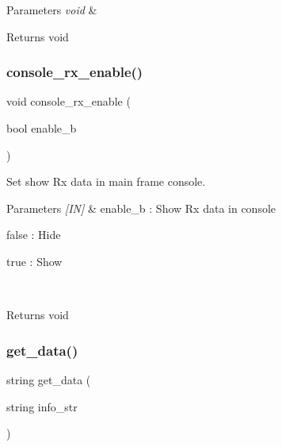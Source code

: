 \begin{DoxyCode}{0}
\end{DoxyCode}



\begin{DoxyParams}{Parameters}
{\em void} & \\
\hline
\end{DoxyParams}
\begin{DoxyReturn}{Returns}
void 
\end{DoxyReturn}
\mbox{\label{classmain__frame_a42466769794c3edd479bc62db0f796f1}} 
\subsubsection{console\_rx\_enable()}
{\footnotesize\ttfamily void console\+\_\+rx\+\_\+enable (\begin{DoxyParamCaption}\item[{bool}]{enable\+\_\+b }\end{DoxyParamCaption})}



Set show Rx data in main frame console. 


\begin{DoxyCode}{0}
\end{DoxyCode}



\begin{DoxyParams}{Parameters}
{\em \mbox{[}\+I\+N\mbox{]}} & enable\+\_\+b \+: Show Rx data in console \begin{DoxyItemize}
\item false \+: Hide \item true \+: Show \end{DoxyItemize}
\\
\hline
\end{DoxyParams}
\begin{DoxyReturn}{Returns}
void 
\end{DoxyReturn}
\mbox{\label{classmain__frame_aaae434e0d6a898619ff85e42ad3f795d}} 
\subsubsection{get\_data()}
{\footnotesize\ttfamily string get\+\_\+data (\begin{DoxyParamCaption}\item[{string}]{info\+\_\+str }\end{DoxyParamCaption})}



